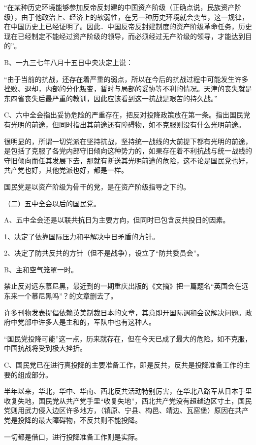 “在某种历史环境能够参加反帝反封建的中国资产阶级（正确点说，民族资产阶级），由于他政治上、经济上的软弱性，在另一种历史环境就会变节，这一规律，在中国历史上已经证明了。因此．中国反帝反封建制度的资产阶级革命任务，历史现在已经制定不能经过资产阶级的领导，而必须经过无产阶级的领导，才能达到目的”。

B、一九三七年八月十五日中央决定上说：

“由于当前的抗战，还存在着严重的弱点，所以在今后的抗战过程中可能发生许多挫败、退却，内部的分化叛变，暂时与局部的妥协等不利的情况。天津的丧失就是东四省丧失后最严重的教训，因此应该看到这一抗战是艰苦的持久战。”

C、六中全会指出妥协危险的严重存在，把反对投降政策放在第一条。指出国民党有光明的前途，但同时指出其前途还有障碍物，如不克服则没有什么光明前途。

很明显的，所谓一切党派在坚持抗战，坚持统一战线的大前提下都有光明的前途，是包括了克服了各党内部守旧倾向这种势力的，如果存在着不利抗战与统一战线的守旧倾向而任其发展下去，那就有断送其光明前途的危险，这不论是国民党也好，共产党也好，其他党派也好，都是一样。

国民党是以资产阶级为骨干的党，是在资产阶级指导之下的。

（二）五中全会以后的国民党。

A、五中全会还是以联共抗日为主要方向，但同时已包含反共投日的因素。

1、决定了依靠国际压力和平解决中日矛盾的方针。

2、决定了防共反共的方针（但不是战争），设立了“防共委员会”。

B、主和空气笼罩一时。

禁止反对远东慕尼黑，最近到的一期重庆出版的《文摘》把一篇题名“英国会在远东来一个慕尼黑吗”？的文章删去了。

许多刊物发表提倡依赖英美制裁日本的文章，其意即开国际调和会议解决问题。政府中党部中许多人是主和的，军队中也有这种人。

“国民党投降可能”这一点，历来就存在，但在今天已成了最大的危险。如不克服，中国抗战将受到极大挫折。

C、国民党已在进行真投降的主要准备工作，即是反共，反共是投降准备工作的主要的组成部分。

半年以来，华北，华中、华南、西北反共活动特别厉害，在华北八路军从日本手里收复失地，国民党从共产党手里“收复失地”，西北共产党没有超越边区寸土，国民党则用武力侵入边区许多地方，（镇原、宁县、构邑、靖边、瓦窑堡）原因在共产党是投降的最大障碍物，不反共则不能投降。

一切都是借口，进行投降准备工作则是实际。

